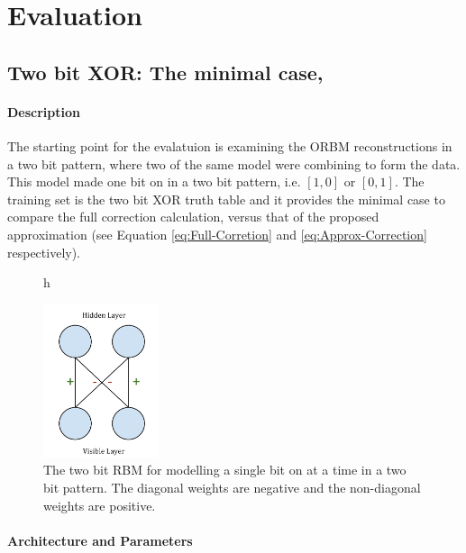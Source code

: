 \chapter{Evaluation}

\section{Two bit XOR: The minimal case,}

\subsubsection{Description}

The starting point for the evalatuion is examining the ORBM reconstructions in a two bit pattern, where two of the same model were combining to form the data. This model made one bit on in a two bit pattern, i.e. $[1 , 0]$ or $[0 , 1]$. The training set is the two bit XOR truth table and it provides the minimal case to compare the full correction calculation, versus that of the proposed approximation (see Equation \ref{eq:Full-Corretion} and \ref{eq:Approx-Correction} respectively).

\begin{figure}{h}
  \begin{center}
    \includegraphics[width=0.3\textwidth]{Assets/Two-Bit-RBM.png}
  \end{center}
  \caption{The two bit RBM for modelling a single bit on at a time in a two bit pattern. The diagonal weights are negative and the non-diagonal weights are positive.}
  \label{F:Two-Bit-RBM}
\end{figure}

\subsubsection{Architecture and Parameters}

